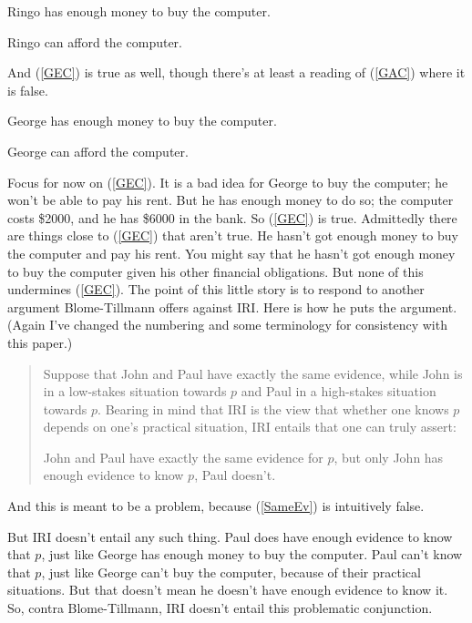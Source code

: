 \documentclass[oneside, a4paper]{book}
\renewcommand{\numbex}[2]{
\begin{enumerate*}
\setcounter{enumi}{\value{paper}}
\renewcommand{\labelenumi}{(\arabic{enumi})}
#2
\end{enumerate*}
\addtocounter{paper}{#1}}
\begin{document}
\numbex{2}{
\item \label{REC} Ringo has enough money to buy the computer.
\item \label{RAC} Ringo can afford the computer.}

\noindent And (\ref{GEC}) is true as well, though there's at least a reading of (\ref{GAC}) where it is false.

\numbex{2}{
\item \label{GEC} George has enough money to buy the computer.
\item \label{GAC} George can afford the computer.
}

\noindent Focus for now on (\ref{GEC}). It is a bad idea for George to buy the computer; he won't be able to pay his rent. But he has enough money to do so; the computer costs \$2000, and he has \$6000 in the bank. So (\ref{GEC}) is true. Admittedly there are things close to (\ref{GEC}) that aren't true. He hasn't got enough money to buy the computer and pay his rent. You might say that he hasn't got enough money to buy the computer given his other financial obligations. But none of this undermines (\ref{GEC}). The point of this little story is to respond to another argument Blome-Tillmann offers against IRI. Here is how he puts the argument. (Again I've changed the numbering and some terminology for consistency with this paper.)

\begin{quote}
\noindent Suppose that John and Paul have exactly the same evidence, while John is in a low-stakes situation towards $p$ and Paul in a high-stakes situation towards $p$. Bearing in mind that IRI is the view that whether one knows $p$ depends on one's practical situation, IRI entails that one can truly assert:

\numbex{1}{
\item \label{SameEv} John and Paul have exactly the same evidence for $p$, but only John has enough evidence to know $p$, Paul doesn't.} \cite[328-9]{MBT2009}
\end{quote}

\noindent And this is meant to be a problem, because (\ref{SameEv}) is intuitively false.

But IRI doesn't entail any such thing. Paul does have enough evidence to know that $p$, just like George has enough money to buy the computer. Paul can't know that $p$, just like George can't buy the computer, because of their practical situations. But that doesn't mean he doesn't have enough evidence to know it. So, contra Blome-Tillmann, IRI doesn't entail this problematic conjunction.
\end{document}
